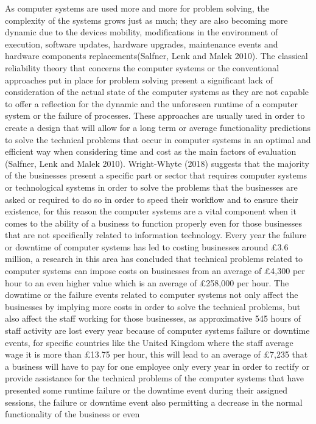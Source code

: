 As computer systems are used more and more for problem solving, the complexity of the systems grows just as much;
they are also becoming more dynamic due to the devices mobility, modifications in the environment of execution,
software updates, hardware upgrades, maintenance events and hardware components replacements(Salfner, Lenk and Malek 2010).
The classical reliability theory that concerns the computer systems or the conventional approaches put in place for
problem solving present a significant lack of consideration of the actual state of the computer systems as they are
not capable to offer a reflection for the dynamic and the unforeseen runtime of a computer system or the failure of
processes. These approaches are usually used in order to create a design that will allow for a long term or average
functionality predictions to solve the technical problems that occur in computer systems in an optimal and efficient
way when considering time and cost as the main factors of evaluation (Salfner, Lenk and Malek 2010). Wright-Whyte (2018)
suggests that the majority of the businesses present a specific part or sector that requires computer systems or
technological systems in order to solve the problems that the businesses are asked or required to do so in order to
speed their workflow and to ensure their existence, for this reason the computer systems are a vital component when
it comes to the ability of a business to function properly even for those businesses that are not specifically related
to information technology. Every year the failure or downtime of computer systems has led to costing businesses
around £3.6 million, a research in this area has concluded that technical problems related to computer systems can impose
costs on businesses from an average of £4,300 per hour to an even higher value which is an average of £258,000 per hour.
The downtime or the failure events related to computer systems not only affect the businesses by implying more costs in
order to solve the technical problems, but also affect the staff working for those businesses, as approximative 545 hours
of staff activity are lost every year because of computer systems failure or downtime events, for specific countries like
the United Kingdom where the staff average wage it is more than £13.75 per hour, this will lead to an average of £7,235 that
a business will have to pay for one employee only every year in order to rectify or provide assistance for the technical
problems of the computer systems that have presented some runtime failure or the downtime event during their assigned
sessions, the failure or downtime event also permitting a decrease in the normal functionality of the business or even
